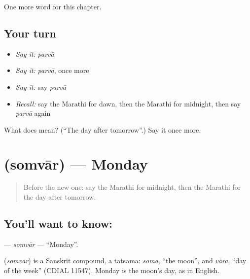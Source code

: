 \begin{grammarlens}[title={What you've built}]
One more word for this chapter.
\end{grammarlens}

\subsection*{Your turn}
\begin{itemize}
\raggedright
  \item \emph{Say it:} \emph{parvā}
  \item \emph{Say it:} \emph{parvā}, once more
  \item \emph{Say it:} say \emph{parvā}
  \item \emph{Recall:} say the Marathi for dawn, then the Marathi for midnight, then say \emph{parvā} again
\end{itemize}

\begin{tcolorbox}[breakable,colback=teal!4,colframe=teal!35!black,title={Before you move on}]
What does  mean? (\textquotedblleft{}The day after tomorrow\textquotedblright{}.) Say it once more.
\end{tcolorbox}
\section[\texorpdfstring{\mr{सोमवार} (somvār)}{सोमवार (somvār)}]{ (somvār) — Monday}

\label{lesson:MR-C124-somvar}



\begin{quote}
Before the new one: say the Marathi for midnight, then the Marathi for the day after tomorrow.
\end{quote}

\subsection*{You'll want to know: }
\textbf{} — \emph{somvār} — \textquotedblleft{}Monday\textquotedblright{}.

\begin{cousinweb}
\textbf{} (\emph{somvār}) is a Sanskrit compound, a tatsama: \emph{soma}, \textquotedblleft{}the moon\textquotedblright{}, and \emph{vāra}, \textquotedblleft{}day of the week\textquotedblright{} (CDIAL 11547). Monday is the moon's day, as in English.
\end{cousinweb}

